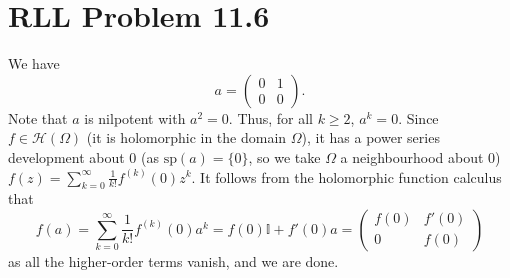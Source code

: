 \documentclass[aps,pra,showpacs,notitlepage,onecolumn,superscriptaddress,nofootinbib]{revtex4-1}
\theoremstyle{definition}
\begin{document}
\section{RLL Problem 11.6}

\noindent We have
\begin{equation}
  a = \begin{pmatrix} 0 & 1 \\ 0 & 0 \end{pmatrix}.
\end{equation}
Note that $a$ is nilpotent with $a^2 = 0$. Thus, for all $k \geq 2$, $a^k = 0$. Since $f \in \mathcal{H}(\Omega)$ (it is holomorphic in the domain $\Omega$), it has a power series development about $0$ (as $\text{sp}(a) = \{0\}$, so
we take $\Omega$ a neighbourhood about $0$) $f(z) = \sum_{k = 0}^{\infty} \frac{1}{k!} f^{(k)}(0) z^k$. It follows from the holomorphic function calculus that
\begin{equation}
  f(a) = \sum_{k = 0}^{\infty} \frac{1}{k!} f^{(k)}(0) a^k = f(0) \mathbb{I} + f'(0) a = \begin{pmatrix} f(0) & f'(0) \\ 0 & f(0) \end{pmatrix}
\end{equation}
as all the higher-order terms vanish, and we are done.
\end{document}
